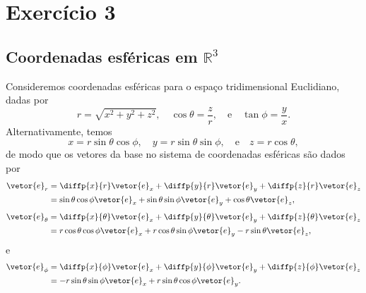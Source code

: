 \section*{Exercício 3}
\subsection*{Coordenadas esféricas em \(\mathbb{R}^3\)}
Consideremos coordenadas esféricas para o espaço tridimensional Euclidiano, dadas por
\begin{equation*}
    r = \sqrt{x^2 + y^2 + z^2},\quad \cos\theta = \frac{z}{r},\quad\text{e}\quad\tan\phi=\frac{y}{x}.
\end{equation*}
Alternativamente, temos
\begin{equation*}
    x = r\sin\theta\cos\phi,\quad y = r\sin\theta\sin\phi,\quad\text{e}\quad z = r\cos\theta,
\end{equation*}
de modo que os vetores da base no sistema de coordenadas esféricas são dados por
\begin{align*}
    \vetor{e}_r &= \diffp{x}{r}\vetor{e}_x + \diffp{y}{r}\vetor{e}_y + \diffp{z}{r}\vetor{e}_z\\
                &= \sin\theta\cos\phi\vetor{e}_x + \sin\theta\sin\phi\vetor{e}_y + \cos\theta \vetor{e}_z,
\end{align*}
\begin{align*}
    \vetor{e}_\theta &= \diffp{x}{\theta}\vetor{e}_x + \diffp{y}{\theta}\vetor{e}_y + \diffp{z}{\theta}\vetor{e}_z \\
                   &= r\cos\theta\cos\phi \vetor{e}_x + r\cos\theta\sin\phi\vetor{e}_y - r\sin\theta\vetor{e}_z,
\end{align*}
e
\begin{align*}
    \vetor{e}_\phi &= \diffp{x}{\phi}\vetor{e}_x + \diffp{y}{\phi}\vetor{e}_y + \diffp{z}{\phi}\vetor{e}_z\\
                   &= -r\sin\theta\sin\phi \vetor{e}_x + r\sin\theta\cos\phi\vetor{e}_y.
\end{align*}

